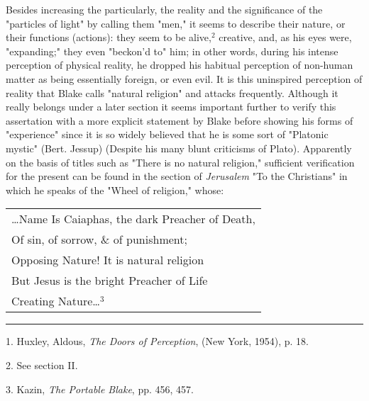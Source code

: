 \hspace*{5mm}Besides increasing the particularly, the reality and the significance of the "particles of light"
by calling them "men," it seems to describe their nature, or their functions (actions):
they seem to be alive,$^{2}$ creative, and, as his eyes were, "expanding;" they even
"beckon'd to" him; in other words, during his intense perception of physical reality, he dropped
his habitual perception of non-human matter as being essentially foreign, or even evil. It is this uninspired
perception of reality that Blake calls "natural religion" and attacks frequently.
Although it really belongs under a later section it seems important further to verify this
assertation with a more explicit statement by Blake before showing his forms of "experience" since it
is so widely believed that he is some sort of "Platonic mystic" (Bert. Jessup) (Despite his many blunt
criticisms of Plato). Apparently on the basis of titles such as "There is no
natural religion," sufficient verification for the present can be found in the section of \textit{Jerusalem}
"To the Christians" in which he speaks of the "Wheel of religion," whose:\linebreak
\null\par
\vspace*{-\baselineskip}
\begin{center}
	\parbox{0.8\textwidth}{
		\centering
		\begin{tabular}{l}
			\dots Name Is Caiaphas, the dark Preacher of Death, \\
			Of sin, of sorrow, \& of punishment;                \\
			Opposing Nature! It is natural religion             \\
			But Jesus is the bright Preacher of Life            \\
			Creating Nature\dots$^{3}$
		\end{tabular}
	}%
\end{center}
\vspace*{\fill}
\noindent\rule{0.25\textwidth}{0.4pt}\par
1. Huxley, Aldous, \textit{The Doors of Perception}, (New York, 1954), p. 18.\par
2. See section II.\par
3. Kazin, \textit{The Portable Blake}, pp. 456, 457.\par

\newpage

